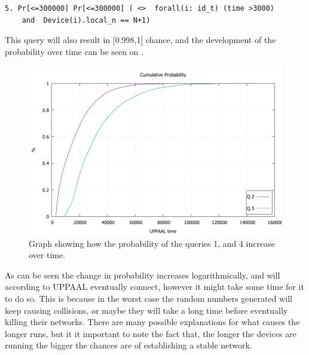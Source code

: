 \begin{lstlisting}[style=UPPAAL, title={This query asks after 3000 UPPAAL time units has passed, what then is the probability that a device \texttt{i} has a local value of \texttt{n} to be equal to the number of devices, which is \texttt{N} + 1, which means that all devices are in the same network.}]
5. Pr[<=300000] Pr[<=300000] ( <>  forall(i: id_t) (time >3000) 
	and  Device(i).local_n == N+1)
\end{lstlisting}

\noindent This query will also result in [0.998,1] chance, and the development of the probability over time can be seen on .


\begin{figure}
  \includegraphics[width=1\textwidth]{Figures/Graphs/ConnectTime.pdf} 
\caption{Graph showing how the probability of the queries 1, and 4 increase over time.}
\label{fig:ConnectQueryTime}
\end{figure}

As can be seen the change in probability increases logarithmically, and will according to UPPAAL eventually connect, however it might take some time for it to do so.
This is because in the worst case the random numbers generated will keep causing collisions, or maybe they will take a long time before eventually killing their networks.
There are many possible explanations for what causes the longer runs, but it it important to note the fact that, the longer the devices are running the bigger the chances are of establishing a stable network.


